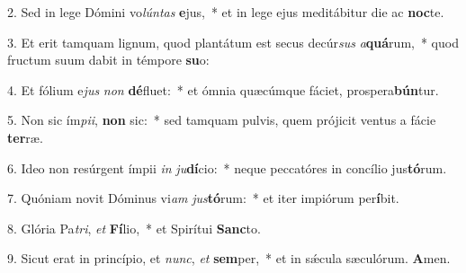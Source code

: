 2. Sed in lege Dómini vo\textit{lún}\textit{tas} \textbf{e}jus,~*  et in lege ejus meditábitur die ac \textbf{noc}te.\

3. Et erit tamquam lignum, quod plantátum est secus decúr\textit{sus} \textit{a}\textbf{quá}rum,~*  quod fructum suum dabit in témpore \textbf{su}o:\

4. Et fólium e\textit{jus} \textit{non} \textbf{dé}fluet:~*  et ómnia quæcúmque fáciet, prospera\textbf{bún}tur.\

5. Non sic ím\textit{pi}\textit{i}, \textbf{non} sic:~*  sed tamquam pulvis, quem prójicit ventus a fácie \textbf{ter}ræ.\

6. Ideo non resúrgent ímpii \textit{in} \textit{ju}\textbf{dí}cio:~*  neque peccatóres in concílio jus\textbf{tó}rum.\

7. Quóniam novit Dóminus vi\textit{am} \textit{jus}\textbf{tó}rum:~*  et iter impiórum per\textbf{í}bit.\

8. Glória Pa\textit{tri}, \textit{et} \textbf{Fí}lio,~*  et Spirítui \textbf{Sanc}to.\

9. Sicut erat in princípio, et \textit{nunc}, \textit{et} \textbf{sem}per,~*  et in sǽcula sæculórum. \textbf{A}men.\

